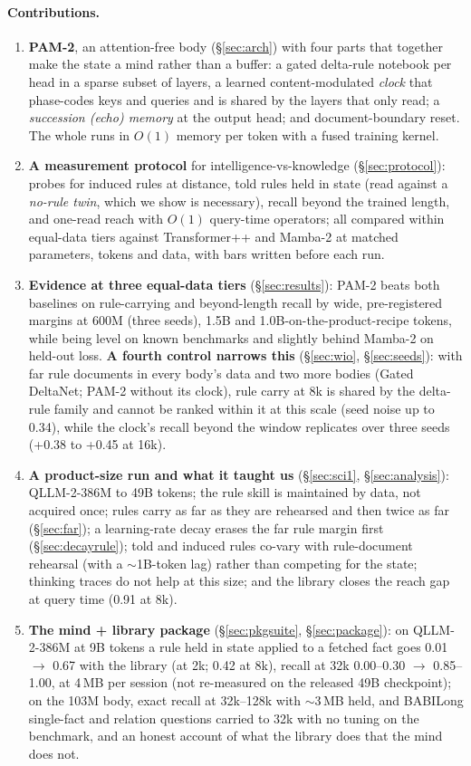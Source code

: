 \documentclass[11pt]{article}
\newcommand{\model}{QLLM-2}
\newcommand{\arch}{PAM-2}
\newcommand{\tpp}{Transformer++}
\newcommand{\mamba}{Mamba-2}
\begin{document}
\paragraph{Contributions.}
\begin{enumerate}[leftmargin=1.4em,itemsep=1pt]
\item \textbf{\arch{}}, an attention-free body (\S\ref{sec:arch}) with four parts that together make the state a mind rather than a buffer: a gated delta-rule notebook per head in a sparse subset of layers, a learned content-modulated \emph{clock} that phase-codes keys and queries and is shared by the layers that only read; a \emph{succession (echo) memory} at the output head; and document-boundary reset. The whole runs in $O(1)$ memory per token with a fused training kernel.
\item \textbf{A measurement protocol} for intelligence-vs-knowledge (\S\ref{sec:protocol}): probes for induced rules at distance, told rules held in state (read against a \emph{no-rule twin}, which we show is necessary), recall beyond the trained length, and one-read reach with $O(1)$ query-time operators; all compared within equal-data tiers against \tpp{} and \mamba{} at matched parameters, tokens and data, with bars written before each run.
\item \textbf{Evidence at three equal-data tiers} (\S\ref{sec:results}): \arch{} beats both baselines on rule-carrying and beyond-length recall by wide, pre-registered margins at 600M (three seeds), 1.5B and 1.0B-on-the-product-recipe tokens, while being level on known benchmarks and slightly behind \mamba{} on held-out loss. \textbf{A fourth control narrows this} (\S\ref{sec:wio}, \S\ref{sec:seeds}): with far rule documents in every body's data and two more bodies (Gated DeltaNet; \arch{} without its clock), rule carry at 8k is shared by the delta-rule family and cannot be ranked within it at this scale (seed noise up to 0.34), while the clock's recall beyond the window replicates over three seeds (+0.38 to +0.45 at 16k).
\item \textbf{A product-size run and what it taught us} (\S\ref{sec:sci1}, \S\ref{sec:analysis}): \model-386M to 49B tokens; the rule skill is maintained by data, not acquired once; rules carry as far as they are rehearsed and then twice as far (\S\ref{sec:far}); a learning-rate decay erases the far rule margin first (\S\ref{sec:decayrule}); told and induced rules co-vary with rule-document rehearsal (with a $\sim$1B-token lag) rather than competing for the state; thinking traces do not help at this size; and the library closes the reach gap at query time (0.91 at 8k).
\item \textbf{The mind + library package} (\S\ref{sec:pkgsuite}, \S\ref{sec:package}): on \model-386M at 9B tokens a rule held in state applied to a fetched fact goes 0.01 $\to$ 0.67 with the library (at 2k; 0.42 at 8k), recall at 32k 0.00--0.30 $\to$ 0.85--1.00, at 4\,MB per session (not re-measured on the released 49B checkpoint); on the 103M body, exact recall at 32k--128k with $\sim$3\,MB held, and BABILong single-fact and relation questions carried to 32k with no tuning on the benchmark, and an honest account of what the library does that the mind does not.
\end{enumerate}
\end{document}
